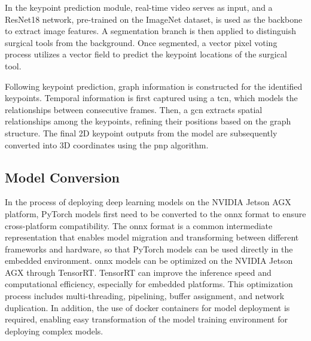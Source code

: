 \documentclass[12pt]{article}
\begin{document}
In the keypoint prediction module, real-time video serves as input, and a ResNet18 network, pre-trained on the ImageNet dataset, is used as the backbone to extract image features. A segmentation branch is then applied to distinguish surgical tools from the background. Once segmented, a vector pixel voting process utilizes a vector field to predict the keypoint locations of the surgical tool\cite{xu2023graph}.

Following keypoint prediction, graph information is constructed for the identified keypoints. Temporal information is first captured using a \gls{tcn}\cite{zeng2020srnet}, which models the relationships between consecutive frames. Then, a \gls{gcn}\cite{yan2018spatial} extracts spatial relationships among the keypoints, refining their positions based on the graph structure\cite{xu2023graph}. The final 2D keypoint outputs from the model are subsequently converted into 3D coordinates using the \gls{pnp} algorithm\cite{yun2017object}.


\subsection{Model Conversion}
In the process of deploying deep learning models on the NVIDIA Jetson AGX platform, PyTorch models first need to be converted to the \gls{onnx} format to ensure cross-platform compatibility. The \gls{onnx} format is a common intermediate representation that enables model migration and transforming between different frameworks and hardware, so that PyTorch models can be used directly in the embedded environment. \gls{onnx} models can be optimized on the NVIDIA Jetson AGX through TensorRT. TensorRT can improve the inference speed and computational efficiency, especially for embedded platforms. This optimization process includes multi-threading, pipelining, buffer assignment, and network duplication\cite{Jeong2022TensorRTBasedFA}\cite{karumbunathan2022nvidia}. In addition, the use of docker containers for model deployment is required, enabling easy transformation of the model training environment for deploying complex models\cite{10283807}.
\end{document}
